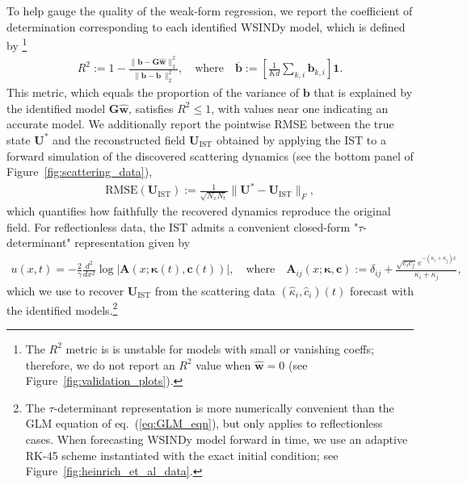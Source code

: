 \documentclass[journal=gmj]{CUP-JNL-DTM}%
\theoremstyle{definition}
\numberwithin{equation}{section}
\begin{document}
To help gauge the quality of the weak-form regression, we report the coefficient of determination corresponding to each identified WSINDy model, which is defined by
\footnote{The $R^2$ metric is is unstable for models with small or vanishing coeffs; therefore, we do not report an $R^2$ value when $\hat{\mathbf{w}}=0$ (see Figure~\ref{fig:validation_plots}).}
\begin{align*}
    R^2 := 1 - \frac{\| \mathbf{b} - \mathbf{G}\hat{\mathbf{w}} \|_2^2}{\| \mathbf{b} - \overline{\mathbf{b}} \, \|_2^2},
    \quad \text{where} \quad
    \overline{\mathbf{b}} := \left[\frac{1}{Kd} \sum_{k,i} \mathbf{b}_{k,i}\right] \mathbf{1}.
\end{align*} This metric, which equals the proportion of the variance of $\mathbf{b}$ that is explained by the identified model $\mathbf{G}\hat{\mathbf{w}}$, satisfies $R^2 \leq 1$, with values near one indicating an accurate model. We additionally report the pointwise RMSE between the true state $\mathbf{U}^*$ and the reconstructed field $\mathbf{U}_{\text{IST}}$ obtained by applying the IST to a forward simulation of the discovered scattering dynamics (see the bottom panel of Figure~\ref{fig:scattering_data}), \begin{align}\label{eq:IST_reconstruction_RMSE}
    \text{RMSE}(\mathbf{U}_{\text{IST}})
    := \frac{1}{\sqrt{N_{\!x}N_t}} \big\| \mathbf{U}^* - \mathbf{U}_{\text{IST}} \big\|_F,
\end{align} which quantifies how faithfully the recovered dynamics reproduce the original field. For reflectionless data, the IST admits a convenient closed-form "$\tau$-determinant" representation \cite{Hirota1971PhysRevLett} given by \begin{align*}
    u(x,t) = -\frac{2}{\gamma} \frac{d^2}{dx^2} \log|\mathbf{A}(x; \boldsymbol{\kappa}(t), \mathbf{c}(t))|,
    \quad \text{where} \quad
    \mathbf{A}_{ij}(x; \boldsymbol{\kappa}, \mathbf{c}) := \delta_{ij} + \frac{\sqrt{c_ic_{\!j}}\, e^{-(\kappa_i + \kappa_j)x}}{\kappa_i + \kappa_j},
\end{align*} which we use to recover $\mathbf{U}_{\text{IST}}$ from the scattering data $(\hat{\kappa}_i, \hat{c}_i)(t)$ forecast with the identified models.\footnote{The $\tau$-determinant representation is more numerically convenient than the GLM equation of eq.~(\ref{eq:GLM_eqn}), but only applies to reflectionless cases. When forecasting WSINDy model forward in time, we use an adaptive RK-45 scheme instantiated with the exact initial condition; see Figure~\ref{fig:heinrich_et_al_data}.}
\end{document}
